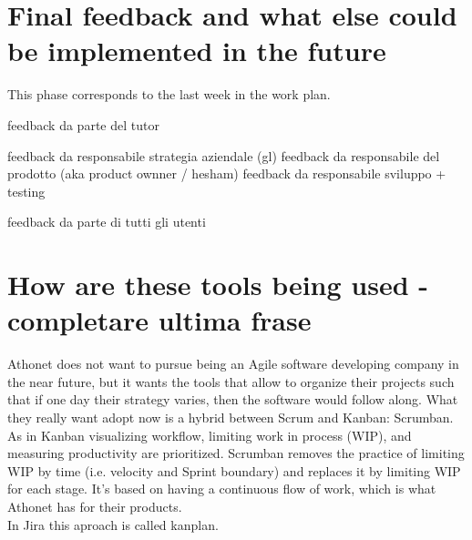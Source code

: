 \section{Final feedback and what else could be implemented in the future}

	This phase corresponds to the last week in the work plan.
	
	feedback da parte del tutor
	
	feedback da responsabile strategia aziendale (gl)
	feedback da responsabile del prodotto (aka product ownner / hesham)
	feedback da responsabile sviluppo + testing
	
	feedback da parte di tutti gli utenti

\section{How are these tools being used - completare ultima frase}
	Athonet does not want to pursue being an Agile software developing company in the near future, but it wants the tools that allow to organize their projects such that if one day their strategy varies, then the software would follow along.
	What they really want adopt now is a hybrid between Scrum and Kanban: Scrumban.\\	
	As in Kanban visualizing workflow, limiting work in process (WIP), and measuring productivity are prioritized.	
	Scrumban removes the practice of limiting WIP by time (i.e. velocity and Sprint boundary) and replaces it by limiting WIP for each stage.
	It's based on having a continuous flow of work, which is what Athonet has for their products.\\	
	In Jira this aproach is called kanplan.
	